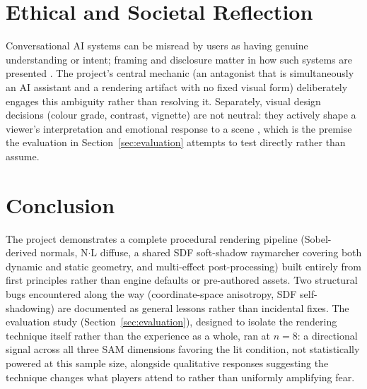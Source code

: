 \documentclass[conference]{IEEEtran}
\begin{document}
\section{Ethical and Societal Reflection}
\label{sec:ethics}
Conversational AI systems can be misread by users as having genuine understanding or intent; framing and disclosure matter in how such systems are presented \cite{turing1950computing,turkle2011alone}. The project's central mechanic (an antagonist that is simultaneously an AI assistant and a rendering artifact with no fixed visual form) deliberately engages this ambiguity rather than resolving it. Separately, visual design decisions (colour grade, contrast, vignette) are not neutral: they actively shape a viewer's interpretation and emotional response to a scene \cite{arnheim1954art}, which is the premise the evaluation in Section~\ref{sec:evaluation} attempts to test directly rather than assume.

\section{Conclusion}
The project demonstrates a complete procedural rendering pipeline (Sobel-derived normals, N$\cdot$L diffuse, a shared SDF soft-shadow raymarcher covering both dynamic and static geometry, and multi-effect post-processing) built entirely from first principles rather than engine defaults or pre-authored assets. Two structural bugs encountered along the way (coordinate-space anisotropy, SDF self-shadowing) are documented as general lessons rather than incidental fixes. The evaluation study (Section~\ref{sec:evaluation}), designed to isolate the rendering technique itself rather than the experience as a whole, ran at $n=8$: a directional signal across all three SAM dimensions favoring the lit condition, not statistically powered at this sample size, alongside qualitative responses suggesting the technique changes what players attend to rather than uniformly amplifying fear.



\end{document}
